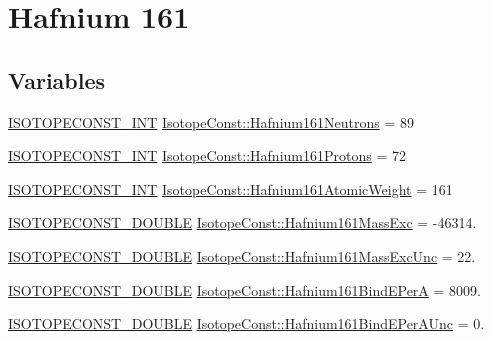 \hypertarget{group___isotope_const-_hafnium-_hf161}{}\section{Hafnium 161}
\label{group___isotope_const-_hafnium-_hf161}
\subsection*{Variables}
\begin{DoxyCompactItemize}
\item 
\mbox{\hyperlink{group___isotope_const-_macros_ga5f18360b3e99483a35c32d789e62621c}{I\+S\+O\+T\+O\+P\+E\+C\+O\+N\+S\+T\+\_\+\+I\+NT}} \mbox{\hyperlink{group___isotope_const-_hafnium-_hf161_ga07a10a785ee0808ff50b2084ea208dc3}{Isotope\+Const\+::\+Hafnium161\+Neutrons}} = 89
\item 
\mbox{\hyperlink{group___isotope_const-_macros_ga5f18360b3e99483a35c32d789e62621c}{I\+S\+O\+T\+O\+P\+E\+C\+O\+N\+S\+T\+\_\+\+I\+NT}} \mbox{\hyperlink{group___isotope_const-_hafnium-_hf161_gadd6018108b5dd75799ea33e227b0dd87}{Isotope\+Const\+::\+Hafnium161\+Protons}} = 72
\item 
\mbox{\hyperlink{group___isotope_const-_macros_ga5f18360b3e99483a35c32d789e62621c}{I\+S\+O\+T\+O\+P\+E\+C\+O\+N\+S\+T\+\_\+\+I\+NT}} \mbox{\hyperlink{group___isotope_const-_hafnium-_hf161_ga2601b785342538f9641faf2fa264f373}{Isotope\+Const\+::\+Hafnium161\+Atomic\+Weight}} = 161
\item 
\mbox{\hyperlink{group___isotope_const-_macros_ga8f45a7272ce02c0b4c65c44636ed719a}{I\+S\+O\+T\+O\+P\+E\+C\+O\+N\+S\+T\+\_\+\+D\+O\+U\+B\+LE}} \mbox{\hyperlink{group___isotope_const-_hafnium-_hf161_ga9bbca7aa648838bed94e4aff5708f89c}{Isotope\+Const\+::\+Hafnium161\+Mass\+Exc}} = -\/46314.
\item 
\mbox{\hyperlink{group___isotope_const-_macros_ga8f45a7272ce02c0b4c65c44636ed719a}{I\+S\+O\+T\+O\+P\+E\+C\+O\+N\+S\+T\+\_\+\+D\+O\+U\+B\+LE}} \mbox{\hyperlink{group___isotope_const-_hafnium-_hf161_gad9b6426734875159a2038b06ec1ff233}{Isotope\+Const\+::\+Hafnium161\+Mass\+Exc\+Unc}} = 22.
\item 
\mbox{\hyperlink{group___isotope_const-_macros_ga8f45a7272ce02c0b4c65c44636ed719a}{I\+S\+O\+T\+O\+P\+E\+C\+O\+N\+S\+T\+\_\+\+D\+O\+U\+B\+LE}} \mbox{\hyperlink{group___isotope_const-_hafnium-_hf161_ga61118553f81f411356902ca11c14e57d}{Isotope\+Const\+::\+Hafnium161\+Bind\+E\+PerA}} = 8009.
\item 
\mbox{\hyperlink{group___isotope_const-_macros_ga8f45a7272ce02c0b4c65c44636ed719a}{I\+S\+O\+T\+O\+P\+E\+C\+O\+N\+S\+T\+\_\+\+D\+O\+U\+B\+LE}} \mbox{\hyperlink{group___isotope_const-_hafnium-_hf161_gab3b743c2830b87fa8d6ea3811ec82ada}{Isotope\+Const\+::\+Hafnium161\+Bind\+E\+Per\+A\+Unc}} = 0.

\end{DoxyCompactItemize}
